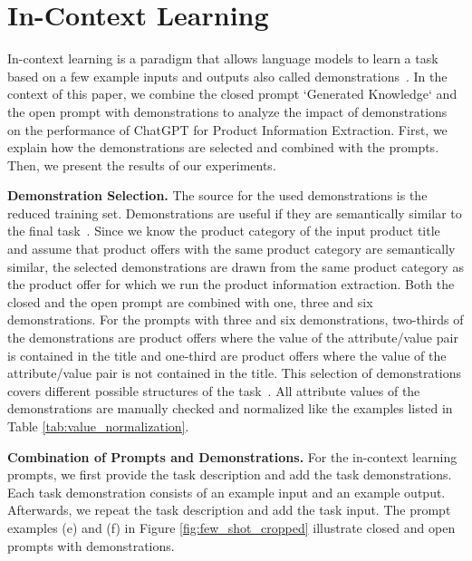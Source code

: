 \section{In-Context Learning}
\label{sec:in_context_learning}

In-context learning is a paradigm that allows language models to learn a task based on a few example inputs and outputs also called demonstrations~\cite{brown_language_2020,dong_survey_2023}. 
In the context of this paper, we combine the closed prompt `Generated Knowledge` and the open prompt with demonstrations to analyze the impact of demonstrations on the performance of ChatGPT for Product Information Extraction. First, %
we explain how the demonstrations are selected and combined with the prompts. %
Then, we present the results of our experiments.

\vspace{.2cm}\noindent\textbf{Demonstration Selection.}
The source for the used demonstrations is the reduced training set. Demonstrations are useful if they are semantically similar to the final task~\cite{liu_what_2022}. Since we know the product category of the input product title and assume that product offers with the same product category are semantically similar, the selected demonstrations are drawn from the same product category as the product offer for which we run the product information extraction. Both the closed and the open prompt are combined with one, three and six demonstrations. For the prompts with three and six demonstrations, two-thirds of the demonstrations are product offers where the value of the attribute/value pair is contained in the title and one-third are product offers where the value of the attribute/value pair is not contained in the title. This selection of demonstrations covers different possible structures of the task~\cite{levy_diverse_2022}. All attribute values of the demonstrations are manually checked and normalized like the examples listed in Table \ref{tab:value_normalization}.

\vspace{.2cm}\noindent\textbf{Combination of Prompts and Demonstrations.} For the in-context learning prompts, we first provide the task description and add the task demonstrations. Each task demonstration consists of an example input and an example output. Afterwards, we repeat the task description and add the task input.
The prompt examples (e) and (f) in Figure \ref{fig:few_shot_cropped} illustrate closed and open prompts with demonstrations.

